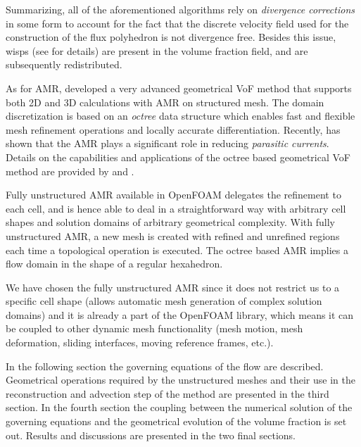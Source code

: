 Summarizing, all of the aforementioned algorithms rely on \emph{divergence corrections}  
in some form to account for the fact that the discrete velocity field used for the
construction of the flux polyhedron is not divergence free. Besides this issue,
wisps (see \citet{HarvieFletcherStream2000} for details) are present in the
volume fraction field, and are subsequently redistributed. 

As for AMR, \citet{PopinetTreeAMR2003} developed a very advanced geometrical VoF method 
that supports both 2D and 3D calculations with AMR on structured mesh. The
domain discretization is based on an \emph{octree} data structure which enables
fast and flexible mesh refinement operations and locally accurate
differentiation.  Recently, \citet{PopinetBalancedForce2009} has shown that the
AMR plays a significant role in reducing \emph{parasitic currents}. Details on
the capabilities and applications of the octree based geometrical VoF method
are provided by \citet{FusterPopinet2009} and \citet{AgbaglahPopinet2011}. 

Fully unstructured AMR available in OpenFOAM delegates the refinement to each
cell, and is hence able to deal in a straightforward way with arbitrary cell
shapes and solution domains of arbitrary geometrical complexity. With fully
unstructured AMR, a new mesh is created with refined and unrefined regions each
time a topological operation is executed. The octree based AMR implies a flow
domain in the shape of a regular hexahedron. %

We have chosen the fully unstructured AMR since it does not restrict us to a 
specific cell shape (allows automatic mesh generation of complex solution 
domains) and it is already a part of the OpenFOAM library, which means it can 
be coupled to other dynamic mesh functionality (mesh motion, mesh deformation, 
sliding interfaces, moving reference frames, etc.). 

In the following section the governing equations of the flow are described.
Geometrical operations required by the unstructured meshes and their use in the
reconstruction and advection step of the method are presented in the third
section. In the fourth section the coupling between the numerical solution of
the governing equations and the geometrical evolution of the volume fraction is
set out. Results and discussions are presented in the two final sections.
